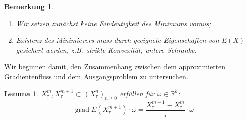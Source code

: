 \documentclass[11pt,a4paper,notitlepage]{scrreprt}
\newcommand{\RR}{\mathbb{R}}
\newcommand{\grad}{\operatorname{grad}}
\newtheorem{lem}[defi]{Lemma}
\newtheorem{bem}[defi]{Bemerkung}
\begin{document}
\begin{bem}
\begin{enumerate}
\item Wir setzen zunächst keine Eindeutigkeit des Minimums voraus;
\item Existenz des Minimierers muss durch geeignete Eigenschaften von $E(X)$ gesichert werden, z.B. strikte Konvexität, untere Schranke.
\end{enumerate}
\end{bem}
\vspace{3pt}

Wir beginnen damit, den Zusammenhang zwischen dem approximierten Gradientenfluss und dem Ausgangsproblem zu untersuchen.

\begin{lem}
$X_\tau^m,X_\tau^{m+1}\subset(X_\tau^n)_{n\geq 0}$ erfüllen für $\omega\in\RR^k$: \\
\begin{equation}
-\grad E(X_\tau^{m+1})\cdot\omega= \dfrac{ X_\tau^{m+1}-X_\tau^m}{\tau}\cdot\omega \label{approxgrad}
\end{equation}
\end{lem}
\end{document}
